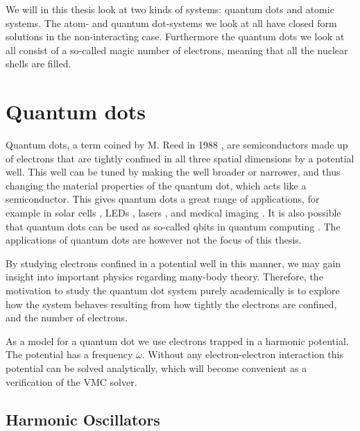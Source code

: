 We will in this thesis look at two kinds of systems: quantum dots and
atomic systems. The atom- and quantum dot-systems we look at all have
closed form solutions in the non-interacting case. Furthermore the
quantum dots we look at all consist of a so-called magic number of
electrons, meaning that all the nuclear shells are filled.

\section{Quantum dots}
	Quantum dots, a term coined by M. Reed in 1988 \cite{Reed88}, are semiconductors made up of electrons that are tightly confined in all three spatial dimensions by a potential well. This well can be tuned by making the well broader or narrower, and thus changing the material properties of the quantum dot, which acts like a semiconductor. This gives quantum dots a great range of applications, for example in solar cells \cite{QDsolarCells}, LEDs \cite{QD_LED}, lasers \cite{QDlaser}, and medical imaging \cite{QDImaging}. It is also possible that quantum dots can be used as so-called qbits in quantum computing \cite{qbitRef}. The applications of quantum dots are however not the focus of this thesis.

	By studying electrons confined in a potential well in this manner, we may gain insight into important physics regarding many-body theory. Therefore, the motivation to study the quantum dot system purely  academically is to explore how the system behaves resulting from how tightly the electrons are confined, and the number of electrons.

	As a model for a quantum dot we use electrons trapped in a harmonic potential. The potential has a frequency $\omega$. Without any electron-electron interaction this potential can be solved analytically, which will become convenient as a verification of the VMC solver. 


	\subsection{Harmonic Oscillators} 

